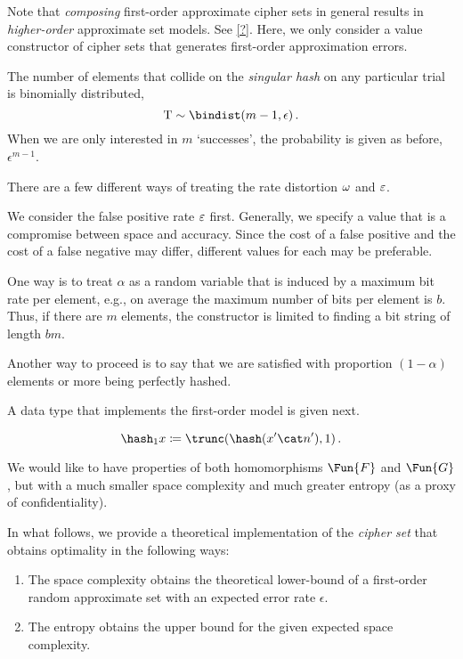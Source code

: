 \documentclass[ ../main.tex]{subfiles}
\begin{document}
Note that \emph{composing} first-order approximate cipher sets in general results in \emph{higher-order} approximate set models.
See \cref{?}.
Here, we only consider a value constructor of cipher sets that generates first-order approximation errors.

The number of elements that collide on the \emph{singular hash} on any particular trial is binomially distributed,
\begin{equation}
    \RV{T} \sim \bindist(m-1,\epsilon)\,.
\end{equation}
When we are only interested in $m$ `successes', the probability is given as before, $\epsilon^{m-1}$.

There are a few different ways of treating the rate distortion $\omega$ and $\varepsilon$.

We consider the false positive rate $\varepsilon$ first.
Generally, we specify a value that is a compromise between space and accuracy.
Since the cost of a false positive and the cost of a false negative may differ, different values for each may be preferable.

One way is to treat $\alpha$ as a random variable that is induced by a maximum bit rate per element, e.g., on average the maximum number of bits per element is $b$.
Thus, if there are $m$ elements, the constructor is limited to finding a bit string of length $b m$.

Another way to proceed is to say that we are satisfied with proportion $(1-\alpha)$ elements or more being perfectly hashed.













A data type that implements the first-order model is given next.


\begin{equation}
    \hash_1 x \coloneqq \trunc(\hash (x' \cat n'),1)\,.
\end{equation}




We would like to have properties of both homomorphisms $\Fun{F}$ and $\Fun{G}$, but with a much smaller space complexity and much greater entropy (as a proxy of confidentiality).

In what follows, we provide a theoretical implementation of the \emph{cipher set} that obtains optimality in the following ways:
\begin{enumerate}
    \item The space complexity obtains the theoretical lower-bound of a first-order random approximate set with an expected error rate $\epsilon$.
    \item The entropy obtains the upper bound for the given expected space complexity.
\end{enumerate}
\end{document}
